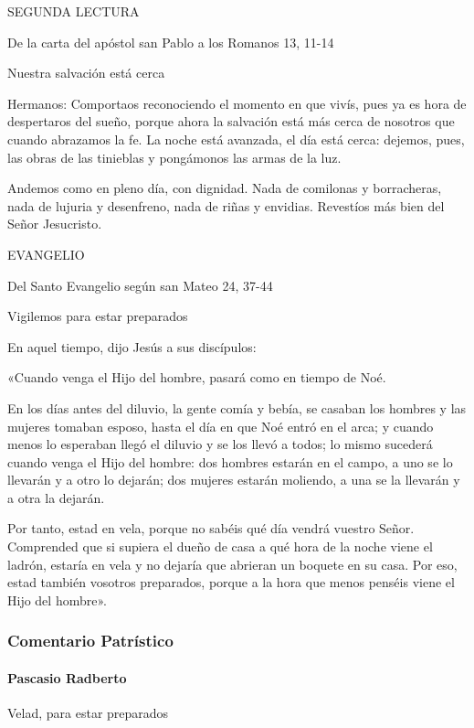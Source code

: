 \documentclass[]{article}
\let\oldparagraph\paragraph
\renewcommand{\paragraph}[1]{\oldparagraph{#1}\mbox{}}
\begin{document}
SEGUNDA LECTURA

De la carta del apóstol san Pablo a los Romanos 13, 11-14

Nuestra salvación está cerca

Hermanos: Comportaos reconociendo el momento en que vivís, pues ya es hora de despertaros del sueño, porque ahora la salvación está más cerca de nosotros que cuando abrazamos la fe. La noche está avanzada, el día está cerca: dejemos, pues, las obras de las tinieblas y pongámonos las armas de la luz.

Andemos como en pleno día, con dignidad. Nada de comilonas y borracheras, nada de lujuria y desenfreno, nada de riñas y envidias. Revestíos más bien del Señor Jesucristo.

EVANGELIO

Del Santo Evangelio según san Mateo 24, 37-44

Vigilemos para estar preparados

En aquel tiempo, dijo Jesús a sus discípulos:

«Cuando venga el Hijo del hombre, pasará como en tiempo de Noé.

En los días antes del diluvio, la gente comía y bebía, se casaban los hombres y las mujeres tomaban esposo, hasta el día en que Noé entró en el arca; y cuando menos lo esperaban llegó el diluvio y se los llevó a todos; lo mismo sucederá cuando venga el Hijo del hombre: dos hombres estarán en el campo, a uno se lo llevarán y a otro lo dejarán; dos mujeres estarán moliendo, a una se la llevarán y a otra la dejarán.

Por tanto, estad en vela, porque no sabéis qué día vendrá vuestro Señor. Comprended que si supiera el dueño de casa a qué hora de la noche viene el ladrón, estaría en vela y no dejaría que abrieran un boquete en su casa. Por eso, estad también vosotros preparados, porque a la hora que menos penséis viene el Hijo del hombre».



\subsubsection{Comentario Patrístico}\label{comentario-patruxedstico}

\paragraph{Pascasio Radberto}\label{pascasio-radberto}

Velad, para estar preparados
\end{document}
